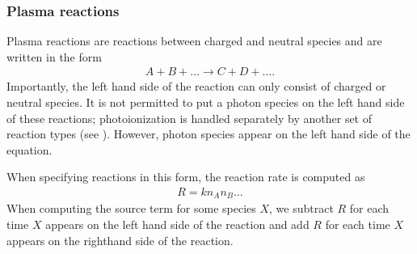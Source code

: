 \documentclass[letterpaper,10pt,english]{sphinxmanual}
\begin{document}
\begin{sphinxVerbatim}[commandchars=\\\{\},formatcom=\scriptsize]
   \PYG{p}{[}
        
        
        
          
          
        
        
   \PYG{p}{]}
\end{sphinxVerbatim}


\subsubsection{Plasma reactions}
\label{\detokenize{Applications/CdrPlasmaModel:plasma-reactions}}\label{\detokenize{Applications/CdrPlasmaModel:chap-cdrplasmareactionsjson}}
\sphinxAtStartPar
Plasma reactions are reactions between charged and neutral species and are written in the form
\begin{equation*}
\begin{split}A + B + \ldots \rightarrow C + D + \ldots.\end{split}
\end{equation*}
\sphinxAtStartPar
Importantly, the left hand side of the reaction can only consist of charged or neutral species.
It is not permitted to put a photon species on the left hand side of these reactions; photo\sphinxhyphen{}ionization is handled separately by another set of reaction types (see {\hyperref[\detokenize{Applications/CdrPlasmaModel:chap-photoreactionsjson}]{}}).
However, photon species  appear on the left hand side of the equation.

\sphinxAtStartPar
When specifying reactions in this form, the reaction rate is computed as
\begin{equation*}
\begin{split}R = k n_A n_B\ldots\end{split}
\end{equation*}
\sphinxAtStartPar
When computing the source term for some species \(X\), we subtract \(R\) for each time \(X\) appears on the left hand side of the reaction and add \(R\) for each time \(X\) appears on the right\sphinxhyphen{}hand side of the reaction.
\end{document}
